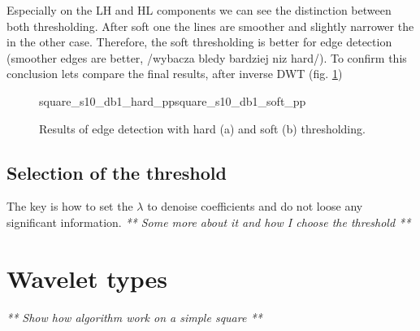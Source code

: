 Especially on the LH and HL components we can see the distinction between both thresholding. After soft one the lines are smoother and slightly narrower the in the other case. Therefore, the soft thresholding is better for edge detection (smoother edges are better, /wybacza bledy bardziej niz hard/). To confirm this conclusion lets compare the final results, after inverse DWT (fig. \ref{fig:square_s10_idwt_pp})

\begin{figure}[h]
	\begin{subdiagrams}{square_s10_db1_hard_pp}{square_s10_db1_soft_pp}
	\end{subdiagrams}
	\centering
	\caption{Results of edge detection with hard (a) and soft (b) thresholding.}
	\label{fig:square_s10_idwt_pp}
\end{figure}

\subsection{Selection of the threshold}
The key is how to set the $\lambda$ to denoise coefficients and do not loose any significant information.
\textit{** Some more about it and how I choose the threshold **}

\section{Wavelet types}

\textit{** Show how algorithm work on a simple square **}